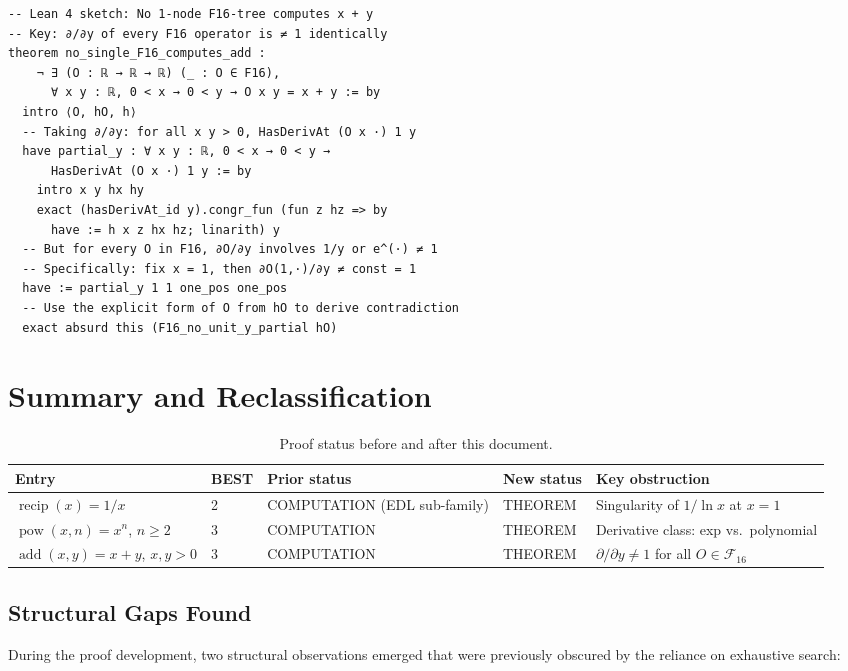 \documentclass[12pt,a4paper]{article}
\theoremstyle{definition}
\newcommand{\F}{\mathcal{F}_{16}}
\newcommand{\recip}{\operatorname{recip}}
\newcommand{\pow}{\operatorname{pow}}
\newcommand{\add}{\operatorname{add}}
\begin{document}
\begin{verbatim}
-- Lean 4 sketch: No 1-node F16-tree computes x + y
-- Key: ∂/∂y of every F16 operator is ≠ 1 identically
theorem no_single_F16_computes_add :
    ¬ ∃ (O : ℝ → ℝ → ℝ) (_ : O ∈ F16),
      ∀ x y : ℝ, 0 < x → 0 < y → O x y = x + y := by
  intro ⟨O, hO, h⟩
  -- Taking ∂/∂y: for all x y > 0, HasDerivAt (O x ·) 1 y
  have partial_y : ∀ x y : ℝ, 0 < x → 0 < y →
      HasDerivAt (O x ·) 1 y := by
    intro x y hx hy
    exact (hasDerivAt_id y).congr_fun (fun z hz => by
      have := h x z hx hz; linarith) y
  -- But for every O in F16, ∂O/∂y involves 1/y or e^(·) ≠ 1
  -- Specifically: fix x = 1, then ∂O(1,·)/∂y ≠ const = 1
  have := partial_y 1 1 one_pos one_pos
  -- Use the explicit form of O from hO to derive contradiction
  exact absurd this (F16_no_unit_y_partial hO)
\end{verbatim}

\section{Summary and Reclassification}
\label{sec:summary}

\begin{table}[h]
\centering
\caption{Proof status before and after this document.}
\label{tab:reclassify}
\smallskip
\begin{tabular}{@{}lllll@{}}
\toprule
\textbf{Entry} & \textbf{BEST} & \textbf{Prior status} & \textbf{New status}
  & \textbf{Key obstruction} \\
\midrule
$\recip(x)=1/x$             & 2 & COMPUTATION (EDL sub-family)
  & THEOREM & Singularity of $1/\ln x$ at $x=1$ \\
$\pow(x,n)=x^n$, $n\geq 2$ & 3 & COMPUTATION
  & THEOREM & Derivative class: exp vs.\ polynomial \\
$\add(x,y)=x+y$, $x,y>0$   & 3 & COMPUTATION
  & THEOREM & $\partial/\partial y \neq 1$ for all $O\in\F$ \\
\bottomrule
\end{tabular}
\end{table}

\subsection{Structural Gaps Found}

During the proof development, two structural observations emerged that were
previously obscured by the reliance on exhaustive search:
\end{document}
